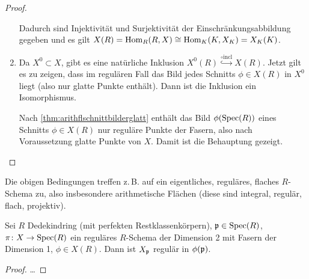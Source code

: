 \documentclass[german]{scrreprt}
\begin{document}
\begin{Satz}
\begin{proof}
\begin{enumerate}[label=(\roman*)]
\begin{center}
      \end{center}
      Dadurch sind Injektivität und Surjektivität der
      Einschränkungsabbildung gegeben und es gilt
      $X(R)=\operatorname{Hom}_R(R,X)\cong\operatorname{Hom}_{K}(K,X_{K})=X_{K}(K)$.
    \item Da $X^0\subset X$, gibt es eine natürliche Inklusion
      $X^0(R)\overset{\circ \text{incl}}{\hookrightarrow} X(R)$.
      Jetzt gilt es zu zeigen, dass im regulären Fall das Bild jedes
      Schnitts $\phi\in X(R)$ in $X^0$ liegt (also nur glatte Punkte
      enthält). Dann ist die Inklusion ein Isomorphismus.

      
      Nach \autoref{thm:arithflschnittbilderglatt} enthält das Bild
      $\phi(\operatorname{Spec}(R))$ eines Schnitts $\phi\in X(R)$ nur reguläre
      Punkte der Fasern, also nach Voraussetzung glatte Punkte von $X$.
      Damit ist die Behauptung gezeigt.
    \end{enumerate}
  \end{proof}
\end{Satz}

\begin{Bemerkung}
  Die obigen Bedingungen treffen z.\,B. auf ein eigentliches,
  reguläres, flaches $R$-Schema zu, also insbesondere arithmetische
  Flächen (diese sind integral, regulär, flach, projektiv).
\end{Bemerkung}

\begin{Lemma}\label{thm:arithflschnittbilderglatt}
  Sei $R$ Dedekindring (mit perfekten Restklassenkörpern),
  $\mathfrak{p}\in\operatorname{Spec}(R)$,
  $\pi\colon X\to\operatorname{Spec}(R)$ ein reguläres $R$-Schema der Dimension 2
  mit Fasern der Dimension 1,
  $\phi\in X(R)$.
  Dann ist $X_{\mathfrak{p}}$ regulär in $\phi(\mathfrak{p})$.
  \cite[Proposition IV.4.3]{silverman2}
  \begin{proof}
    …  
  \end{proof}
\end{Lemma}
\end{document}
